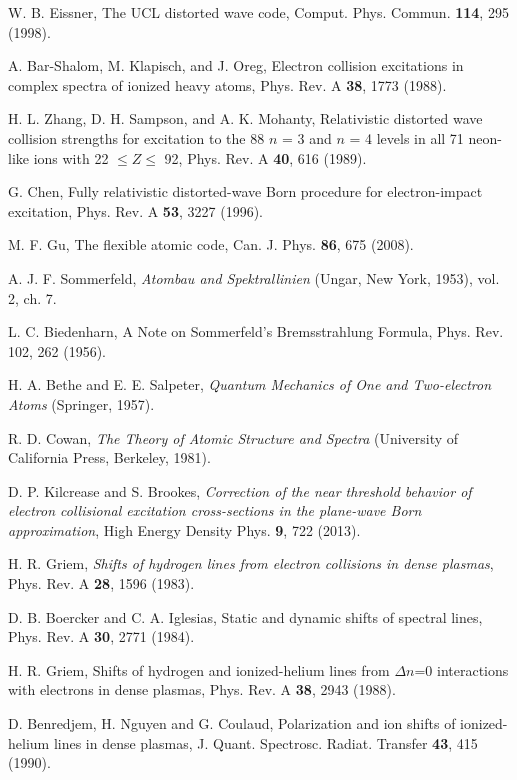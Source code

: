 \documentclass[a4paper,10pt]{article}
\begin{document}
\begin{thebibliography}{99}
W. B. Eissner, The UCL distorted wave code, Comput. Phys. Commun. {\bf 114}, 295 (1998).

A. Bar-Shalom, M. Klapisch, and J. Oreg, Electron collision excitations in complex spectra of ionized heavy atoms, Phys. Rev. A {\bf 38}, 1773 (1988).

H. L. Zhang, D. H. Sampson, and A. K. Mohanty, Relativistic distorted wave collision strengths for excitation to the 88 $n$ = 3 and $n$ = 4 levels in all 71 neon-like ions with 22 $\leq Z \leq$ 92, Phys. Rev. A {\bf 40}, 616 (1989).

G. Chen, Fully relativistic distorted-wave Born procedure for electron-impact excitation, Phys. Rev. A {\bf 53}, 3227 (1996).

M. F. Gu, The flexible atomic code, Can. J. Phys. {\bf 86}, 675 (2008). %

A. J. F. Sommerfeld, {\it Atombau and Spektrallinien} (Ungar, New York, 1953), vol. 2, ch. 7.

L. C. Biedenharn, A Note on Sommerfeld's Bremsstrahlung Formula, Phys. Rev. 102, 262 (1956).

H. A. Bethe and E. E. Salpeter, {\it Quantum Mechanics of One and Two-electron Atoms} (Springer, 1957).

R. D. Cowan, {\it The Theory of Atomic Structure and Spectra} (University of California Press, Berkeley, 1981).

D. P. Kilcrease and S. Brookes, {\it Correction of the near threshold behavior of electron collisional excitation cross-sections in the plane-wave Born approximation}, High Energy Density Phys. {\bf 9}, 722 (2013).

H. R. Griem, {\it Shifts of hydrogen lines from electron collisions in dense plasmas}, Phys. Rev. A {\bf 28}, 1596 (1983).

D. B. Boercker and C. A. Iglesias, Static and dynamic shifts of spectral lines, Phys. Rev. A {\bf 30}, 2771 (1984).

H. R. Griem, Shifts of hydrogen and ionized-helium lines from $\Delta n$=0 interactions with electrons in dense plasmas, Phys. Rev. A {\bf 38}, 2943 (1988).

D. Benredjem, H. Nguyen and G. Coulaud, Polarization and ion shifts of ionized-helium lines in dense plasmas, J. Quant. Spectrosc. Radiat. Transfer {\bf 43}, 415 (1990).


\end{thebibliography}
\end{document}
